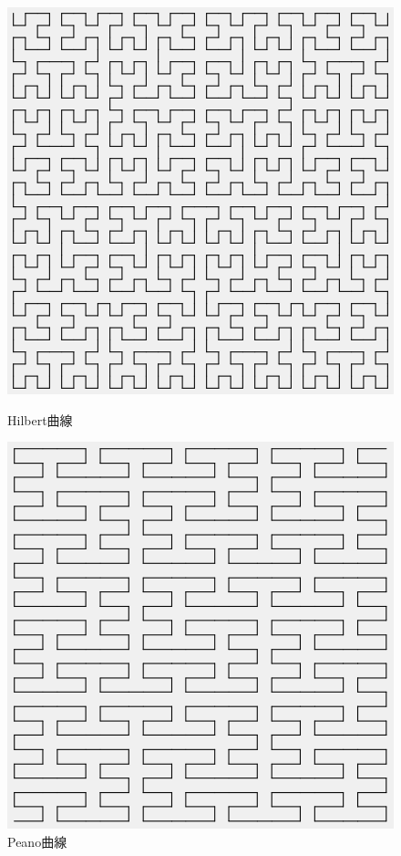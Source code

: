 \documentclass[dvipdfmx]{jsarticle}
\theoremstyle{definition}
\begin{document}
\begin{figure}[ht]
\begin{minipage}{0.5\hsize}
    \begin{center}
        \includegraphics[scale=0.20]{figure/hilbert_curve.png}
    \end{center}
    \caption{Hilbert曲線}
\end{minipage}
\begin{minipage}{0.49\hsize}
    \begin{center}
        \includegraphics[scale=0.20]{figure/peano_curve.png}
    \end{center}
    \caption{Peano曲線}
\end{minipage}
\end{figure}
\end{document}
